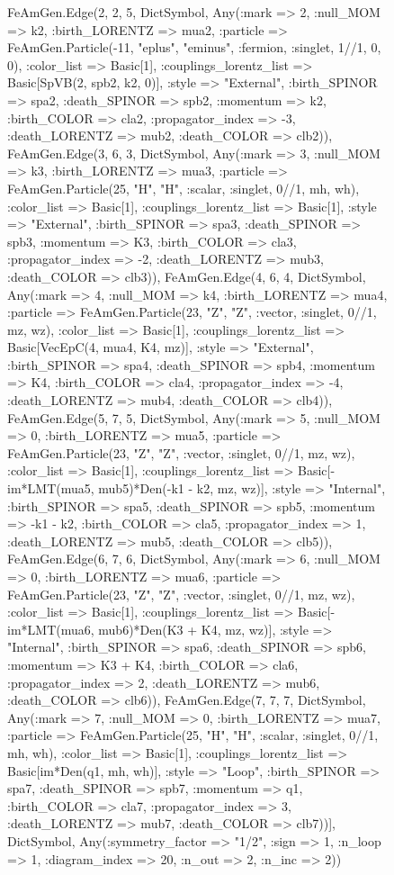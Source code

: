 \documentclass{revtex4}
\begin{document}
\begin{figure}[!htb]
\begin{center}
{FeAmGen.Edge(2, 2, 5, Dict{Symbol, Any}(:mark => 2, :null_MOM => k2, :birth_LORENTZ => mua2, :particle => FeAmGen.Particle(-11, "eplus", "eminus", :fermion, :singlet, 1//1, 0, 0), :color_list => Basic[1], :couplings_lorentz_list => Basic[SpVB(2, spb2, k2, 0)], :style => "External", :birth_SPINOR => spa2, :death_SPINOR => spb2, :momentum => k2, :birth_COLOR => cla2, :propagator_index => -3, :death_LORENTZ => mub2, :death_COLOR => clb2)), FeAmGen.Edge(3, 6, 3, Dict{Symbol, Any}(:mark => 3, :null_MOM => k3, :birth_LORENTZ => mua3, :particle => FeAmGen.Particle(25, "H", "H", :scalar, :singlet, 0//1, mh, wh), :color_list => Basic[1], :couplings_lorentz_list => Basic[1], :style => "External", :birth_SPINOR => spa3, :death_SPINOR => spb3, :momentum => K3, :birth_COLOR => cla3, :propagator_index => -2, :death_LORENTZ => mub3, :death_COLOR => clb3)), FeAmGen.Edge(4, 6, 4, Dict{Symbol, Any}(:mark => 4, :null_MOM => k4, :birth_LORENTZ => mua4, :particle => FeAmGen.Particle(23, "Z", "Z", :vector, :singlet, 0//1, mz, wz), :color_list => Basic[1], :couplings_lorentz_list => Basic[VecEpC(4, mua4, K4, mz)], :style => "External", :birth_SPINOR => spa4, :death_SPINOR => spb4, :momentum => K4, :birth_COLOR => cla4, :propagator_index => -4, :death_LORENTZ => mub4, :death_COLOR => clb4)), FeAmGen.Edge(5, 7, 5, Dict{Symbol, Any}(:mark => 5, :null_MOM => 0, :birth_LORENTZ => mua5, :particle => FeAmGen.Particle(23, "Z", "Z", :vector, :singlet, 0//1, mz, wz), :color_list => Basic[1], :couplings_lorentz_list => Basic[-im*LMT(mua5, mub5)*Den(-k1 - k2, mz, wz)], :style => "Internal", :birth_SPINOR => spa5, :death_SPINOR => spb5, :momentum => -k1 - k2, :birth_COLOR => cla5, :propagator_index => 1, :death_LORENTZ => mub5, :death_COLOR => clb5)), FeAmGen.Edge(6, 7, 6, Dict{Symbol, Any}(:mark => 6, :null_MOM => 0, :birth_LORENTZ => mua6, :particle => FeAmGen.Particle(23, "Z", "Z", :vector, :singlet, 0//1, mz, wz), :color_list => Basic[1], :couplings_lorentz_list => Basic[-im*LMT(mua6, mub6)*Den(K3 + K4, mz, wz)], :style => "Internal", :birth_SPINOR => spa6, :death_SPINOR => spb6, :momentum => K3 + K4, :birth_COLOR => cla6, :propagator_index => 2, :death_LORENTZ => mub6, :death_COLOR => clb6)), FeAmGen.Edge(7, 7, 7, Dict{Symbol, Any}(:mark => 7, :null_MOM => 0, :birth_LORENTZ => mua7, :particle => FeAmGen.Particle(25, "H", "H", :scalar, :singlet, 0//1, mh, wh), :color_list => Basic[1], :couplings_lorentz_list => Basic[im*Den(q1, mh, wh)], :style => "Loop", :birth_SPINOR => spa7, :death_SPINOR => spb7, :momentum => q1, :birth_COLOR => cla7, :propagator_index => 3, :death_LORENTZ => mub7, :death_COLOR => clb7))], Dict{Symbol, Any}(:symmetry_factor => "1/2", :sign => 1, :n_loop => 1, :diagram_index => 20, :n_out => 2, :n_inc => 2)) 
}
\end{center}
\end{figure}
\end{document}
